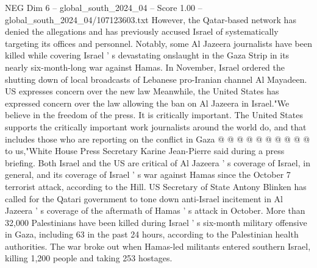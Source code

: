 \begin{textsample}{NEG Dim 6 – global\_south\_2024\_04 – Score 1.00 – global\_south\_2024\_04/107123603.txt}
However, the Qatar-based network has denied the allegations and has previously accused Israel of systematically targeting its offices and personnel.
Notably, some Al Jazeera journalists have been killed while covering Israel ' s devastating onslaught in the Gaza Strip in its nearly six-month-long war against Hamas.
In November, Israel ordered the shutting down of local broadcasts of Lebanese pro-Iranian channel Al Mayadeen.
US expresses concern over the new law Meanwhile, the United States has expressed concern over the law allowing the ban on Al Jazeera in Israel."We believe in the freedom of the press.
It is critically important.
The United States supports the critically important work journalists around the world do, and that includes those who are reporting on the conflict in Gaza @ @ @ @ @ @ @ @ @ @ to us,"White House Press Secretary Karine Jean-Pierre said during a press briefing.
Both Israel and the US are critical of Al Jazeera ' s coverage of Israel, in general, and its coverage of Israel ' s war against Hamas since the October 7 terrorist attack, according to the Hill.
US Secretary of State Antony Blinken has called for the Qatari government to tone down anti-Israel incitement in Al Jazeera ' s coverage of the aftermath of Hamas ' s attack in October.
More than 32,000 Palestinians have been killed during Israel ' s six-month military offensive in Gaza, including 63 in the past 24 hours, according to the Palestinian health authorities.
The war broke out when Hamas-led militants entered southern Israel, killing 1,200 people and taking 253 hostages.

\end{textsample}
